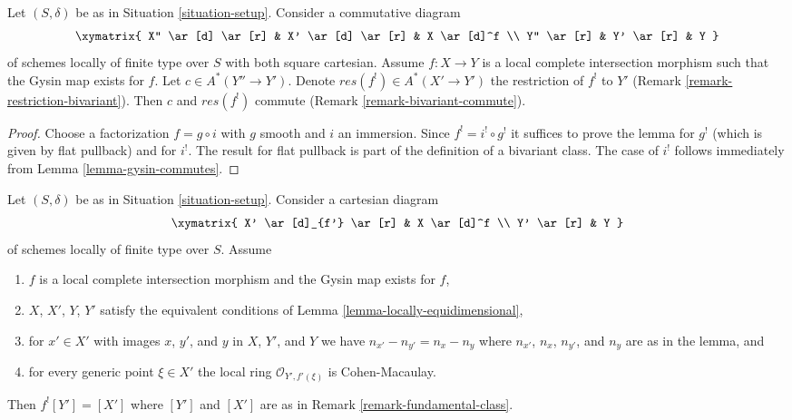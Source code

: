 \begin{lemma}
\label{lemma-lci-gysin-commutes}
Let $(S, \delta)$ be as in Situation \ref{situation-setup}.
Consider a commutative diagram
$$
\xymatrix{
X'' \ar[d] \ar[r] &
X' \ar[d] \ar[r] &
X \ar[d]^f \\
Y'' \ar[r] &
Y' \ar[r] &
Y
}
$$
of schemes locally of finite type over $S$ with both square cartesian.
Assume $f : X \to Y$ is a local complete intersection morphism
such that the Gysin map exists for $f$. Let $c \in A^*(Y'' \to Y')$. Denote
$res(f^!) \in A^*(X' \to Y')$ the restriction of $f^!$ to $Y'$
(Remark \ref{remark-restriction-bivariant}). Then $c$ and $res(f^!)$ commute
(Remark \ref{remark-bivariant-commute}).
\end{lemma}

\begin{proof}
Choose a factorization $f = g \circ i$ with $g$ smooth and $i$ an immersion.
Since $f^! = i^! \circ g^!$ it suffices to prove the lemma for $g^!$
(which is given by flat pullback) and for $i^!$. The result for flat pullback
is part of the definition of a bivariant class. The case of $i^!$ follows
immediately from Lemma \ref{lemma-gysin-commutes}.
\end{proof}

\begin{lemma}
\label{lemma-lci-gysin-easy}
Let $(S, \delta)$ be as in Situation \ref{situation-setup}.
Consider a cartesian diagram
$$
\xymatrix{
X' \ar[d]_{f'} \ar[r] &
X \ar[d]^f \\
Y' \ar[r] &
Y
}
$$
of schemes locally of finite type over $S$. Assume
\begin{enumerate}
\item $f$ is a local complete intersection morphism and
the Gysin map exists for $f$,
\item $X$, $X'$, $Y$, $Y'$ satisfy the equivalent conditions of
Lemma \ref{lemma-locally-equidimensional},
\item for $x' \in X'$ with images $x$, $y'$, and $y$
in $X$, $Y'$, and $Y$ we have $n_{x'} - n_{y'} = n_x - n_y$
where $n_{x'}$, $n_x$, $n_{y'}$, and $n_y$ are as in the lemma, and
\item for every generic point $\xi \in X'$ the local ring
$\mathcal{O}_{Y', f'(\xi)}$ is Cohen-Macaulay.
\end{enumerate}
Then $f^![Y'] = [X']$ where $[Y']$ and $[X']$ are as in
Remark \ref{remark-fundamental-class}.
\end{lemma}

